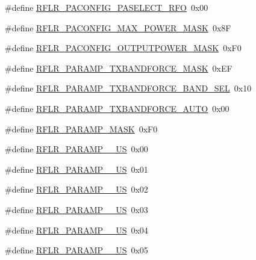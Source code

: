 \begin{DoxyCompactItemize}
\item 
\#define \hyperlink{sx1276Regs-LoRa_8h_a584857e70a2e6fddfb11bc51775b35a6}{R\+F\+L\+R\+\_\+\+P\+A\+C\+O\+N\+F\+I\+G\+\_\+\+P\+A\+S\+E\+L\+E\+C\+T\+\_\+\+R\+FO}~0x00
\item 
\#define \hyperlink{sx1276Regs-LoRa_8h_a2045361d9d317c305aed6e405420ab81}{R\+F\+L\+R\+\_\+\+P\+A\+C\+O\+N\+F\+I\+G\+\_\+\+M\+A\+X\+\_\+\+P\+O\+W\+E\+R\+\_\+\+M\+A\+SK}~0x8F
\item 
\#define \hyperlink{sx1276Regs-LoRa_8h_a1d4448a184c398c43e06bfad5102730f}{R\+F\+L\+R\+\_\+\+P\+A\+C\+O\+N\+F\+I\+G\+\_\+\+O\+U\+T\+P\+U\+T\+P\+O\+W\+E\+R\+\_\+\+M\+A\+SK}~0x\+F0
\item 
\#define \hyperlink{sx1276Regs-LoRa_8h_a9112c35a5e33d45453157d1a04591294}{R\+F\+L\+R\+\_\+\+P\+A\+R\+A\+M\+P\+\_\+\+T\+X\+B\+A\+N\+D\+F\+O\+R\+C\+E\+\_\+\+M\+A\+SK}~0x\+EF
\item 
\#define \hyperlink{sx1276Regs-LoRa_8h_ad45572b9fe781c4e783cc7aef19b1406}{R\+F\+L\+R\+\_\+\+P\+A\+R\+A\+M\+P\+\_\+\+T\+X\+B\+A\+N\+D\+F\+O\+R\+C\+E\+\_\+\+B\+A\+N\+D\+\_\+\+S\+EL}~0x10
\item 
\#define \hyperlink{sx1276Regs-LoRa_8h_aeaf1429172c5196bcaa7f5d3079113d1}{R\+F\+L\+R\+\_\+\+P\+A\+R\+A\+M\+P\+\_\+\+T\+X\+B\+A\+N\+D\+F\+O\+R\+C\+E\+\_\+\+A\+U\+TO}~0x00
\item 
\#define \hyperlink{sx1276Regs-LoRa_8h_a8e2df5205bbee456190800ae3e6c5b48}{R\+F\+L\+R\+\_\+\+P\+A\+R\+A\+M\+P\+\_\+\+M\+A\+SK}~0x\+F0
\item 
\#define \hyperlink{sx1276Regs-LoRa_8h_a17650ac6f6503f25d99fc36183d339fb}{R\+F\+L\+R\+\_\+\+P\+A\+R\+A\+M\+P\+\_\+\_\+\+US}~0x00
\item 
\#define \hyperlink{sx1276Regs-LoRa_8h_a54e4bb780307ff67f9319190a061ed65}{R\+F\+L\+R\+\_\+\+P\+A\+R\+A\+M\+P\+\_\+\_\+\+US}~0x01
\item 
\#define \hyperlink{sx1276Regs-LoRa_8h_aa50dc8d791c24398ad463dbbe163c218}{R\+F\+L\+R\+\_\+\+P\+A\+R\+A\+M\+P\+\_\+\_\+\+US}~0x02
\item 
\#define \hyperlink{sx1276Regs-LoRa_8h_a268b294289d89cac69a2f50608292fb9}{R\+F\+L\+R\+\_\+\+P\+A\+R\+A\+M\+P\+\_\+\_\+\+US}~0x03
\item 
\#define \hyperlink{sx1276Regs-LoRa_8h_a31b242b14f8b2b7fb9bf6a0634fe43e2}{R\+F\+L\+R\+\_\+\+P\+A\+R\+A\+M\+P\+\_\+\_\+\+US}~0x04
\item 
\#define \hyperlink{sx1276Regs-LoRa_8h_a2ae8ceffd161e8c509cc076715b71c15}{R\+F\+L\+R\+\_\+\+P\+A\+R\+A\+M\+P\+\_\+\_\+\+US}~0x05
\item 

\end{DoxyCompactItemize}

